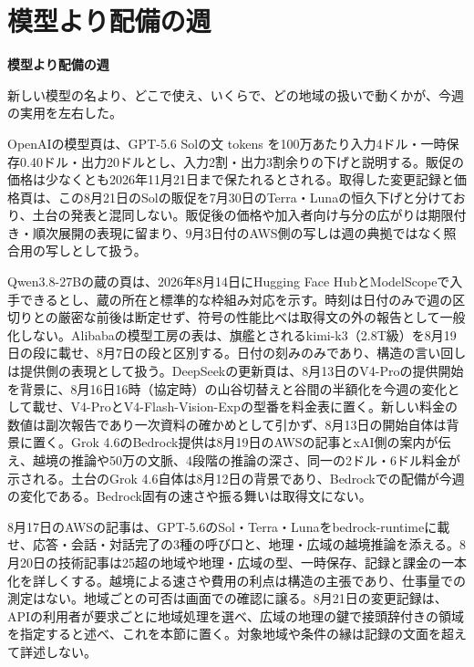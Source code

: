 \section{模型より配備の週}
\begin{wideflow}
{\Large\bfseries 模型より配備の週}\par
\smallskip
{\color{SurveyMuted}新しい模型の名より、どこで使え、いくらで、どの地域の扱いで動くかが、今週の実用を左右した。}\par
\end{wideflow}

\noindent OpenAIの模型頁は、GPT-5.6 Solの文 tokens を100万あたり入力4ドル・一時保存0.40ドル・出力20ドルとし、入力2割・出力3割余りの下げと説明する。販促の価格は少なくとも2026年11月21日まで保たれるとされる。取得した変更記録と価格頁は、この8月21日のSolの販促を7月30日のTerra・Lunaの恒久下げと分けており、土台の発表と混同しない。販促後の価格や加入者向け与分の広がりは期限付き・順次展開の表現に留まり、9月3日付のAWS側の写しは週の典拠ではなく照合用の写しとして扱う。 \cite{w2026w34w34eventc017}\par\medskip

\noindent Qwen3.8-27Bの蔵の頁は、2026年8月14日にHugging Face HubとModelScopeで入手できるとし、蔵の所在と標準的な枠組み対応を示す。時刻は日付のみで週の区切りとの厳密な前後は断定せず、符号の性能比べは取得文の外の報告として一般化しない。Alibabaの模型工房の表は、旗艦とされるkimi-k3（2.8T級）を8月19日の段に載せ、8月7日の段と区別する。日付の刻みのみであり、構造の言い回しは提供側の表現として扱う。DeepSeekの更新頁は、8月13日のV4-Proの提供開始を背景に、8月16日16時（協定時）の山谷切替えと谷間の半額化を今週の変化として載せ、V4-ProとV4-Flash-Vision-Expの型番を料金表に置く。新しい料金の数値は副次報告であり一次資料の確かめとして引かず、8月13日の開始自体は背景に置く。Grok 4.6のBedrock提供は8月19日のAWSの記事とxAI側の案内が伝え、越境の推論や50万の文脈、4段階の推論の深さ、同一の2ドル・6ドル料金が示される。土台のGrok 4.6自体は8月12日の背景であり、Bedrockでの配備が今週の変化である。Bedrock固有の速さや振る舞いは取得文にない。 \cite{w2026w34w34eventc039,w2026w34w34eventgapalibabakimik3modelstudio,w2026w34w34eventc040,w2026w34w34eventc023}\par\medskip

\noindent 8月17日のAWSの記事は、GPT-5.6のSol・Terra・Lunaをbedrock-runtimeに載せ、応答・会話・対話完了の3種の呼び口と、地理・広域の越境推論を添える。8月20日の技術記事は25超の地域や地理・広域の型、一時保存、記録と課金の一本化を詳しくする。越境による速さや費用の利点は構造の主張であり、仕事量での測定はない。地域ごとの可否は画面での確認に譲る。8月21日の変更記録は、APIの利用者が要求ごとに地域処理を選べ、広域の地理の鍵で接頭辞付きの領域を指定すると述べ、これを本節に置く。対象地域や条件の縁は記録の文面を超えて詳述しない。 \cite{w2026w34w34eventc030,w2026w34w34eventc045}\par\medskip

